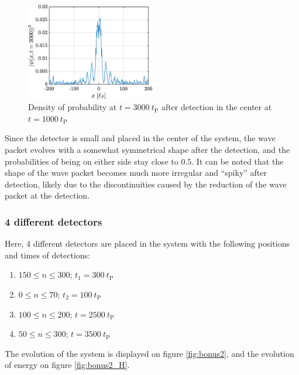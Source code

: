 \documentclass[a4paper,12pt,twoside]{article}
\begin{document}
      \begin{figure}[h!]
      \centering
       \includegraphics[width=0.5\textwidth]{graphs/bonus1_psi.eps}
       \caption{Density of probability at $t=3000~t_\text{P}$ after detection in the center at $t=1000~t_\text{P}$}
       \label{fig:bonus1_psi}
      \end{figure}
      
      Since the detector is small and placed in the center of the system, the wave packet evolves with a somewhat symmetrical shape after the detection, and the probabilities of being on either side stay close to $0.5$. It can be noted that the shape of the wave packet becomes much more irregular and ``spiky'' after detection, likely due to the discontinuities caused by the reduction of the wave packet at the detection.


    \subsubsection{4 different detectors}
    Here, 4 different detectors are placed in the system with the following positions and times of detections:
    \begin{enumerate}
     \item $150\leq n\leq 300$; $t_1=300~t_\text{P}$
     \item $0\leq n\leq 70$; $t_2=100~t_\text{P}$
     \item $100\leq n\leq 200$; $t=2500~t_\text{P}$
     \item $50\leq n\leq 300$; $t=3500~t_\text{P}$
    \end{enumerate}
    
    The evolution of the system is displayed on figure \ref{fig:bonus2}, and the evolution of energy on figure \ref{fig:bonus2_H}.
\end{document}
